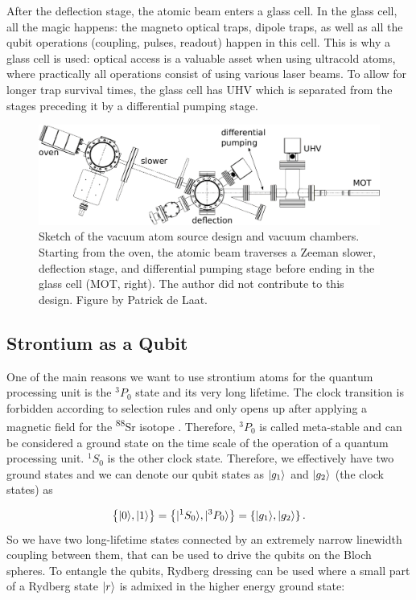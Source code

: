 After the deflection stage, the atomic beam enters a glass cell.
In the glass cell, all the magic happens: the magneto optical traps, dipole traps, as well as all the qubit operations (coupling, pulses, readout) happen in this cell.
This is why a glass cell is used: optical access is a valuable asset when using ultracold atoms, where practically all operations consist of using various laser beams.
To allow for longer trap survival times, the glass cell has \ac{UHV} which is separated from the stages preceding it by a differential pumping stage. 

\begin{figure}
	\centering
	\includegraphics[width=0.8\linewidth]{figures/SrLoading.pdf}
	\caption{Sketch of the vacuum atom source design and vacuum chambers. 
	Starting from the oven, the atomic beam traverses a Zeeman slower, deflection stage, and differential pumping stage before ending in the glass cell (MOT, right). 
	The author did not contribute to this design. 
	Figure by Patrick de Laat.}
	\label{fig:SrLoading}
\end{figure}

\subsection{Strontium as a Qubit}\label{sec:QubitScheme}

One of the main reasons we want to use strontium atoms for the quantum processing unit is the ${}^3P_0$ state and its very long lifetime. 
The clock transition is forbidden according to selection rules and only opens up after applying a magnetic field for the \textsuperscript{88}Sr isotope \cite{Knottnerus2018}.
Therefore, ${}^3P_0$ is called meta-stable and can be considered a ground state on the time scale of the operation of a quantum processing unit. 
${}^1S_0$ is the other clock state.
Therefore, we effectively have two ground states and we can denote our qubit states as $\lvert g_1\rangle$ and $\lvert g_2\rangle$ (the clock states) as

\begin{equation}\label{eq:QubitManifold}
	\big\{\lvert0\rangle,\lvert1\rangle\big\} = 
	\left\{
		\lvert{}^1S_0\rangle, \lvert{}^3P_0\rangle 
	\right\} = 
	\left\{ 
	    \lvert g_1\rangle, \lvert g_2\rangle
	\right\}.
\end{equation}
So we have two long-lifetime states connected by an extremely narrow linewidth coupling between them, that can be used to drive the qubits on the Bloch spheres.
To entangle the qubits, Rydberg dressing can be used \cite{Wu2021} where a small part of a Rydberg state $\lvert r\rangle$ is admixed in the higher energy ground state:

